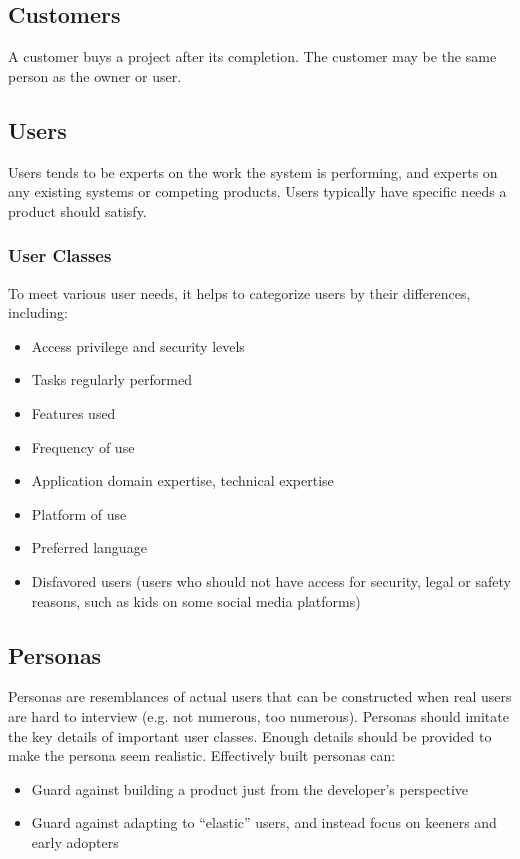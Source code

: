 \documentclass[12pt,titlepage]{article}
\begin{document}
    \subsection{Customers}
      A customer buys a project after its completion. The customer may be the same person as the owner or user.

    \subsection{Users}
      Users tends to be experts on the work the system is performing, and experts on any existing systems or competing products. Users typically
      have specific needs a product should satisfy.

      \subsubsection{User Classes}
        To meet various user needs, it helps to categorize users by their differences, including:
        \begin{itemize}
          \item Access privilege and security levels
          \item Tasks regularly performed
          \item Features used
          \item Frequency of use
          \item Application domain expertise, technical expertise
          \item Platform of use
          \item Preferred language
          \item Disfavored users (users who should not have access for security, legal or safety reasons, such as kids on some social media platforms)
        \end{itemize}

    \subsection{Personas}
      Personas are resemblances of actual users that can be constructed when real users are hard to interview (e.g. not numerous, too numerous). Personas
      should imitate the key details of important user classes. Enough details should be provided to make the persona seem realistic. Effectively built
      personas can:
      \begin{itemize}
        \item Guard against building a product just from the developer's perspective
        \item Guard against adapting to ``elastic'' users, and instead focus on keeners and early adopters
      \end{itemize}
\end{document}
